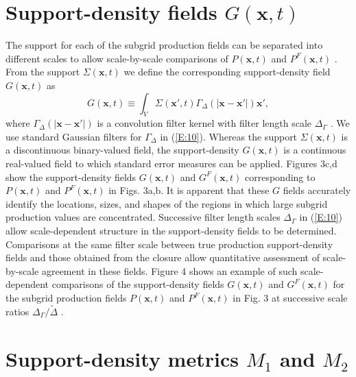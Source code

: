 \section{Support-density fields $G(\mathbf{x},t)$ }

The support for each of the subgrid production fields can be separated into different scales to allow scale-by-scale comparisons of  $P(\mathbf{x},t)$ and $P^F(\mathbf{x},t)$   . From the support  $\Sigma(\mathbf{x},t)$  we define the corresponding support-density field  $G(\mathbf{x},t)$  as 
%
\begin{equation}
	\label{E:10}
	G(\mathbf{x},t) 
	\equiv 
	\int_{V} \Sigma(\mathbf{x'},t)\Gamma_{\Delta}(|\mathbf{x} - \mathbf{x'}|) \mathbf{x'}, 
\end{equation}
%
%                
where $\Gamma_{\Delta}(|\mathbf{x} - \mathbf{x'}|)$  is a convolution filter kernel with filter length scale $\Delta_{\Gamma}$ . We use standard Gaussian filters for $\Gamma_{\Delta}$  in (\ref{E:10}). Whereas the support $\Sigma(\mathbf{x},t)$  is a discontinuous binary-valued field, the support-density $G(\mathbf{x},t)$  is a continuous real-valued field to which standard error measures can be applied. Figures 3c,d show the support-density fields $G(\mathbf{x},t)$  and  $G^{F}(\mathbf{x},t)$ corresponding to   $P(\mathbf{x},t)$  and  $P^{F}(\mathbf{x},t)$   in Figs. 3a,b. It is apparent that these $G$ fields accurately identify the locations, sizes, and shapes of the regions in which large subgrid production values are concentrated. 
Successive filter length scales  $\Delta_{\Gamma}$ in (\ref{E:10}) allow scale-dependent structure in the support-density fields to be determined. Comparisons at the same filter scale between true production support-density fields and those obtained from the closure allow quantitative assessment of scale-by-scale agreement in these fields. Figure 4 shows an example of such scale-dependent comparisons of the support-density fields   $G(\mathbf{x},t)$  and  $G^{F}(\mathbf{x},t)$   for the subgrid production fields   $P(\mathbf{x},t)$  and  $P^{F}(\mathbf{x},t)$   in Fig. 3 at successive scale ratios $\Delta_{\Gamma}/\widetilde{\Delta}$ . 

\section{Support-density metrics  $M_1$ and $M_2$ }

